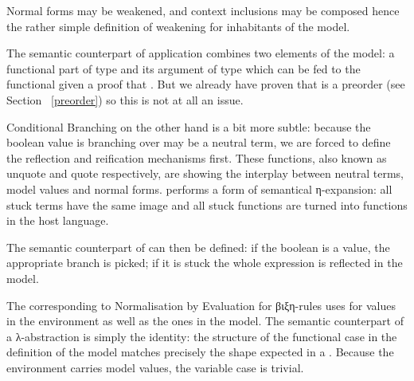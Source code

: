 Normal forms may be weakened, and context inclusions may be composed hence
the rather simple definition of weakening for inhabitants of the model.


The semantic counterpart of application combines two elements of the model:
a functional part of type   \AS{(}  \AS{)}
and its argument of type    which can be fed to the
functional given a proof that   . But we already have
proven that  is a preorder (see Section ~\ref{preorder}) so this
is not at all an issue.


Conditional Branching on the other hand is a bit more subtle: because the boolean
value  is branching over may be a neutral term, we are forced to define
the reflection and reification mechanisms first. These functions, also known as
unquote and quote respectively, are showing the interplay between neutral terms,
model values and normal forms.  performs a form of semantical
η-expansion: all stuck  terms have the same image and all stuck functions
are turned into functions in the host language.


The semantic counterpart of  can then be defined: if the boolean
is a value, the appropriate branch is picked; if it is stuck the whole expression
is reflected in the model.


The  corresponding to Normalisation by Evaluation for βιξη-rules
uses  for values in the environment as well as the ones in the
model. The semantic counterpart of a λ-abstraction is simply the identity: the
structure of the functional case in the definition of the model matches precisely
the shape expected in a . Because the environment carries model values,
the variable case is trivial.


